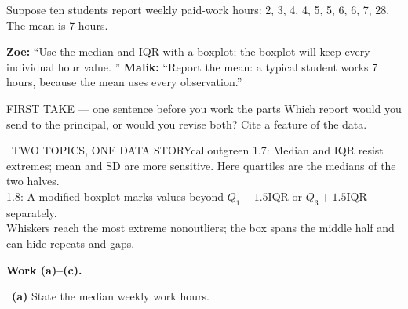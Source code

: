 \documentclass[11pt]{article}
\begin{document}


Suppose ten students report weekly paid-work hours: 2, 3, 4, 4, 5, 5, 6, 6, 7, 28. The mean is 7 hours.\par\smallskip \textbf{Zoe:} ``Use the median and IQR with a boxplot; the boxplot will keep every individual hour value. '' \textbf{Malik:} ``Report the mean: a typical student works 7 hours, because the mean uses every observation.''\par
\begin{center}
\end{center}
\begin{firsttakebox}{FIRST TAKE --- one sentence before you work the parts}
Which report would you send to the principal, or would you revise both? Cite a feature of the data.
\workspace{0.8in}
\end{firsttakebox}

\begin{callout}{\IconBook\ TWO TOPICS, ONE DATA STORY}{calloutgreen}
1.7: Median and IQR resist extremes; mean and SD are more sensitive. Here quartiles are the medians of the two halves.\\ 1.8: A modified boxplot marks values beyond $Q_1-1.5\mathrm{IQR}$ or $Q_3+1.5\mathrm{IQR}$ separately.\\ Whiskers reach the most extreme nonoutliers; the box spans the middle half and can hide repeats and gaps.
\end{callout}

\newpage
\textbf{Work (a)--(c).}\par\smallskip

~\textbf{(a)} State the median weekly work hours.\par
\workspace{0.6in}
\end{document}
